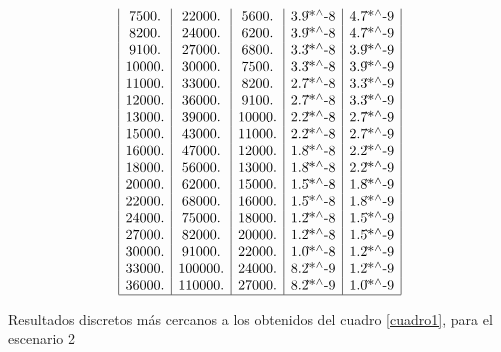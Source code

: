\documentclass{llncs}
\begin{document}
\begin{table}[!h]
$$\begin{array}{|c|c|c|c|c|}
		7500. & 22000. & 5600. & \text{3.9$\grave{ }$*${}^{\wedge}$-8} & \text{4.7$\grave{ }$*${}^{\wedge}$-9} \\
		8200. & 24000. & 6200. & \text{3.9$\grave{ }$*${}^{\wedge}$-8} & \text{4.7$\grave{ }$*${}^{\wedge}$-9} \\
		9100. & 27000. & 6800. & \text{3.3$\grave{ }$*${}^{\wedge}$-8} & \text{3.9$\grave{ }$*${}^{\wedge}$-9} \\
		10000. & 30000. & 7500. & \text{3.3$\grave{ }$*${}^{\wedge}$-8} & \text{3.9$\grave{ }$*${}^{\wedge}$-9} \\
		11000. & 33000. & 8200. & \text{2.7$\grave{ }$*${}^{\wedge}$-8} & \text{3.3$\grave{ }$*${}^{\wedge}$-9} \\
		12000. & 36000. & 9100. & \text{2.7$\grave{ }$*${}^{\wedge}$-8} & \text{3.3$\grave{ }$*${}^{\wedge}$-9} \\
		13000. & 39000. & 10000. & \text{2.2$\grave{ }$*${}^{\wedge}$-8} & \text{2.7$\grave{ }$*${}^{\wedge}$-9} \\
		15000. & 43000. & 11000. & \text{2.2$\grave{ }$*${}^{\wedge}$-8} & \text{2.7$\grave{ }$*${}^{\wedge}$-9} \\
		16000. & 47000. & 12000. & \text{1.8$\grave{ }$*${}^{\wedge}$-8} & \text{2.2$\grave{ }$*${}^{\wedge}$-9} \\
		18000. & 56000. & 13000. & \text{1.8$\grave{ }$*${}^{\wedge}$-8} & \text{2.2$\grave{ }$*${}^{\wedge}$-9} \\
		20000. & 62000. & 15000. & \text{1.5$\grave{ }$*${}^{\wedge}$-8} & \text{1.8$\grave{ }$*${}^{\wedge}$-9} \\
		22000. & 68000. & 16000. & \text{1.5$\grave{ }$*${}^{\wedge}$-8} & \text{1.8$\grave{ }$*${}^{\wedge}$-9} \\
		24000. & 75000. & 18000. & \text{1.2$\grave{ }$*${}^{\wedge}$-8} & \text{1.5$\grave{ }$*${}^{\wedge}$-9} \\
		27000. & 82000. & 20000. & \text{1.2$\grave{ }$*${}^{\wedge}$-8} & \text{1.5$\grave{ }$*${}^{\wedge}$-9} \\
		30000. & 91000. & 22000. & \text{1.0$\grave{ }$*${}^{\wedge}$-8} & \text{1.2$\grave{ }$*${}^{\wedge}$-9} \\
		33000. & 100000. & 24000. & \text{8.2$\grave{ }$*${}^{\wedge}$-9} & \text{1.2$\grave{ }$*${}^{\wedge}$-9} \\
		36000. & 110000. & 27000. & \text{8.2$\grave{ }$*${}^{\wedge}$-9} & \text{1.0$\grave{ }$*${}^{\wedge}$-9} \\
		\hline
		\end{array}
		$$
		\caption{Resultados discretos más cercanos a los obtenidos del cuadro \ref{cuadro1}, para el escenario 2}
                \label{cuadro2}
	\end{table}	
\end{document}

